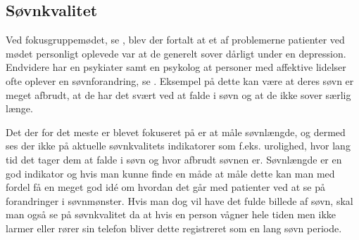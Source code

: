 \subsection{Søvnkvalitet}
Ved fokusgruppemødet, se \citep[Kapitel 1, Sektion 5]{misc:faellesrapp}, blev der fortalt at et af problemerne patienter ved mødet personligt oplevede var at de generelt sover dårligt under en depression.
Endvidere har en psykiater samt en psykolog at personer med affektive lidelser ofte oplever en søvnforandring, se \citep[Kapitel 1, Sektion 3 og 4]{misc:faellesrapp}.
Eksempel på dette kan være at deres søvn er meget afbrudt, at de har det svært ved at falde i søvn og at de ikke sover særlig længe.

Det der for det meste er blevet fokuseret på er at måle søvnlængde, og dermed ses der ikke på aktuelle søvnkvalitets indikatorer som f.eks. urolighed, hvor lang tid det tager dem at falde i søvn og hvor afbrudt søvnen er.
Søvnlængde er en god indikator og hvis man kunne finde en måde at måle dette kan man med fordel få en meget god idé om hvordan det går med patienter ved at se på forandringer i søvnmønster. 
Hvis man dog vil have det fulde billede af søvn, skal man også se på søvnkvalitet da at hvis en person vågner hele tiden men ikke larmer eller rører sin telefon bliver dette registreret som en lang søvn periode.